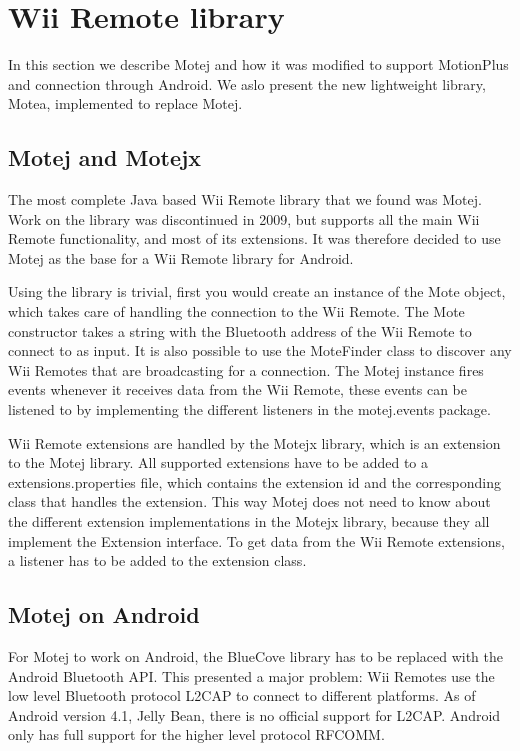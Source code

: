 \section{Wii Remote library}
In this section we describe Motej and how it was modified to support MotionPlus and connection through Android. We aslo present the new lightweight library, Motea, implemented to replace Motej.

\subsection{Motej and Motejx}
The most complete Java based Wii Remote library that we found was Motej. Work on the library was discontinued in 2009, but supports all the main Wii Remote functionality, and most of its extensions. It was therefore decided to use Motej as the base for a Wii Remote library for Android. 

Using the library is trivial, first you would create an instance of the Mote object, which takes care of handling the connection to the Wii Remote. The Mote constructor takes a string with the Bluetooth address of the Wii Remote to connect to as input. It is also possible to use the MoteFinder class to discover any Wii Remotes that are broadcasting for a connection. The Motej instance fires events whenever it receives data from the Wii Remote, these events can be listened to by implementing the different listeners in the motej.events package. 

Wii Remote extensions are handled by the Motejx library, which is an extension to the Motej library. All supported extensions have to be added to a extensions.properties file, which contains the extension id and the corresponding class that handles the extension. This way Motej does not need to know about the different extension implementations in the Motejx library, because they all implement the Extension interface. To get data from the Wii Remote extensions, a listener has to be added to the extension class.

\subsection{Motej on Android}
\label{sec:motejOnAndroid}
For Motej to work on Android, the BlueCove library has to be replaced with the Android Bluetooth API. This presented a major problem: Wii Remotes use the low level Bluetooth protocol L2CAP to connect to different platforms. As of Android version 4.1, Jelly Bean, \cite{jellyBean} there is no official support for L2CAP. Android only has full support for the higher level protocol RFCOMM.

